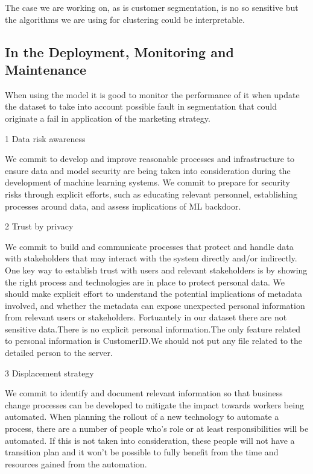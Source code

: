 The case we are working on, as is customer segmentation, is no so
sensitive but the algorithms we are using for clustering could be
interpretable.

\hypertarget{in-the-deployment-monitoring-and-maintenance}{%
\subsection{In the Deployment, Monitoring and
Maintenance}\label{in-the-deployment-monitoring-and-maintenance}}

When using the model it is good to monitor the performance of it when
update the dataset to take into account possible fault in segmentation
that could originate a fail in application of the marketing strategy.

1 Data risk awareness

We commit to develop and improve reasonable processes and infrastructure
to ensure data and model security are being taken into consideration
during the development of machine learning systems. We commit to prepare
for security risks through explicit efforts, such as educating relevant
personnel, establishing processes around data, and assess implications
of ML backdoor.

2 Trust by privacy

We commit to build and communicate processes that protect and handle
data with stakeholders that may interact with the system directly and/or
indirectly. One key way to establish trust with users and relevant
stakeholders is by showing the right process and technologies are in
place to protect personal data. We should make explicit effort to
understand the potential implications of metadata involved, and whether
the metadata can expose unexpected personal information from relevant
users or stakeholders. Fortuantely in our dataset there are not
sensitive data.There is no explicit personal information.The only
feature related to personal information is CustomerID.We should not put
any file related to the detailed person to the server.

3 Displacement strategy

We commit to identify and document relevant information so that business
change processes can be developed to mitigate the impact towards workers
being automated. When planning the rollout of a new technology to
automate a process, there are a number of people who's role or at least
responsibilities will be automated. If this is not taken into
consideration, these people will not have a transition plan and it won't
be possible to fully benefit from the time and resources gained from the
automation.

